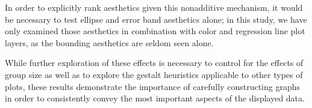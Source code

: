\documentclass[11pt]{isuthesis}\usepackage[]{graphicx}\usepackage[]{color}
\begin{document}
In order to explicitly rank aesthetics given this nonadditive mechanism, it would be necessary to test ellipse and error band aesthetics alone; in this study, we have only examined those aesthetics in combination with color and regression line plot layers, as the bounding aesthetics are seldom seen alone. 

While further exploration of these effects is necessary to control for the effects of group size as well as to explore the gestalt heuristics applicable to other types of plots, these results demonstrate the importance of carefully constructing graphs in order to consistently convey the most important aspects of the displayed data. 
% 
% 

\end{document}
